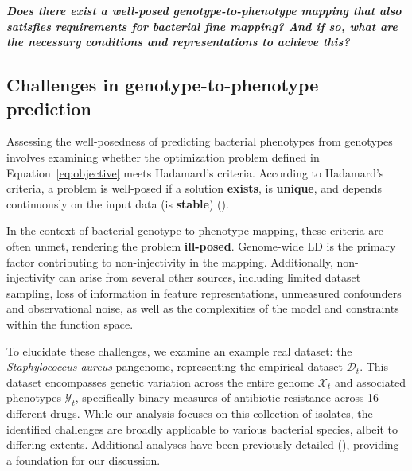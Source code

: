 \documentclass[12pt]{article}
\begin{document}
\textbf{\textit{Does there exist a well-posed genotype-to-phenotype mapping that also satisfies requirements for bacterial fine mapping? And if so, what are the necessary conditions and representations to achieve this?}}



\subsection{Challenges in genotype-to-phenotype prediction}

Assessing the well-posedness of predicting bacterial phenotypes from genotypes involves examining whether the optimization problem defined in Equation \ref{eq:objective} meets Hadamard's criteria. According to Hadamard's criteria, a problem is well-posed if a solution \textbf{exists}, is \textbf{unique}, and depends continuously on the input data (is \textbf{stable}) (\cite{hadamard2014lectures}). 

In the context of bacterial genotype-to-phenotype mapping,  these criteria are often unmet, rendering the problem \textbf{ill-posed}. Genome-wide LD is the primary factor contributing to non-injectivity in the mapping. Additionally, non-injectivity can arise from several other sources, including limited dataset sampling, loss of information in feature representations, unmeasured confounders and observational noise, as well as the complexities of the model and constraints within the function space.

To elucidate these challenges, we examine an example real dataset: the \textit{Staphylococcus aureus} pangenome, representing the empirical dataset $\mathcal{D}_t$. This dataset encompasses genetic variation across the entire genome $\mathcal{X}_t$ and associated phenotypes $\mathcal{Y}_t$, specifically binary measures of antibiotic resistance across 16 different drugs. While our analysis focuses on this collection of isolates, the identified challenges are broadly applicable to various bacterial species, albeit to differing extents. Additional analyses have been previously detailed (\cite{wheeler2019contrasting}), providing a foundation for our discussion.
\end{document}
